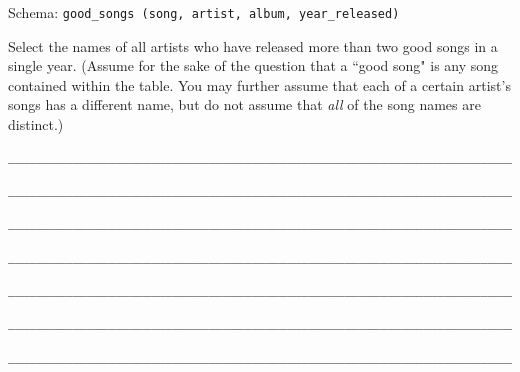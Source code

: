 \documentclass[twoside]{article}
\begin{document}
\begin{enumerate}

Schema: \texttt{good\_songs (song, artist, album, year\_released)}

Select the names of all artists who have released more than two good songs in a single year. (Assume for the sake of the question that a ``good song" is any song contained within the table. You may further assume that each of a certain artist's songs has a different name, but do not assume that \textit{all} of the song names are distinct.)

\begin{verbatim}
___________________________________________________________________________________________

___________________________________________________________________________________________

___________________________________________________________________________________________

___________________________________________________________________________________________

___________________________________________________________________________________________

___________________________________________________________________________________________

___________________________________________________________________________________________
\end{verbatim}

\end{enumerate}
\end{document}
